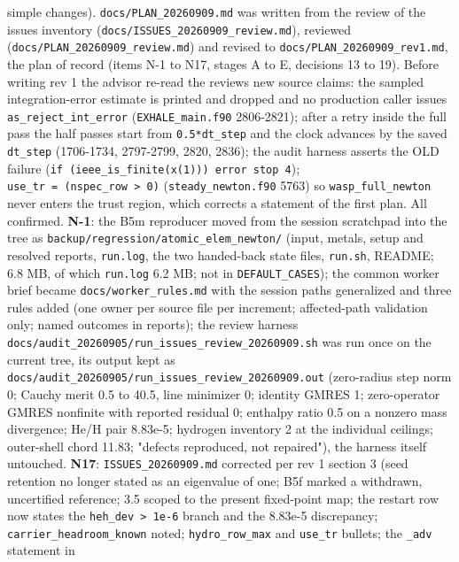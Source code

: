 \documentclass[english,a4paper]{my_memo}
\begin{document}
\begin{itemize}
{  simple changes).} \texttt{docs/PLAN\_20260909.md} was written from the review of
  the issues inventory (\texttt{docs/ISSUES\_20260909\_review.md}), reviewed
  (\texttt{docs/PLAN\_20260909\_review.md}) and revised to \texttt{docs/PLAN\_20260909\_rev1.md},
  the plan of record (items N-1 to N17, stages A to E, decisions 13 to 19).
  Before writing rev 1 the advisor re-read the review\textquotesingle s new source claims:
  the sampled integration-error estimate is printed and dropped and no
  production caller issues \texttt{as\_reject\_int\_error} (\texttt{EXHALE\_main.f90}
  2806-2821); after a retry inside the full pass the half passes start from
  \texttt{0.5*dt\_step} and the clock advances by the saved \texttt{dt\_step} (1706-1734,
  2797-2799, 2820, 2836); the audit harness asserts the OLD failure
  (\texttt{if\ (ieee\_is\_finite(x(1)))\ error\ stop\ 4}); \texttt{use\_tr\ =\ (nspec\_row\ \textgreater{}\ 0)}
  (\texttt{steady\_newton.f90} 5763) so \texttt{wasp\_full\_newton} never enters the trust
  region, which corrects a statement of the first plan. All confirmed. \textbf{N-1}:
  the B5m reproducer moved from the session scratchpad into the tree as
  \texttt{backup/regression/atomic\_elem\_newton/} (input, metals, setup and resolved
  reports, \texttt{run.log}, the two handed-back state files, \texttt{run.sh}, README;
  6.8 MB, of which \texttt{run.log} 6.2 MB; not in \texttt{DEFAULT\_CASES}); the common
  worker brief became \texttt{docs/worker\_rules.md} with the session paths
  generalized and three rules added (one owner per source file per
  increment; affected-path validation only; named outcomes in reports); the
  review harness \texttt{docs/audit\_20260905/run\_issues\_review\_20260909.sh} was run
  once on the current tree, its output kept as
  \texttt{docs/audit\_20260905/run\_issues\_review\_20260909.out} (zero-radius step
  norm 0; Cauchy merit 0.5 to 40.5, line minimizer 0; identity GMRES 1;
  zero-operator GMRES nonfinite with reported residual 0; enthalpy ratio
  0.5 on a nonzero mass divergence; He/H pair 8.83e-5; hydrogen inventory 2
  at the individual ceilings; outer-shell chord 11.83; "defects reproduced,
  not repaired"), the harness itself untouched. \textbf{N17}: \texttt{ISSUES\_20260909.md}
  corrected per rev 1 section 3 (seed retention no longer stated as an
  eigenvalue of one; B5f marked a withdrawn, uncertified reference; 3.5
  scoped to the present fixed-point map; the restart row now states the
  \texttt{heh\_dev\ \textgreater{}\ 1e-6} branch and the 8.83e-5 discrepancy; \texttt{carrier\_headroom\_known}
  noted; \texttt{hydro\_row\_max} and \texttt{use\_tr} bullets; the \texttt{\_adv} statement in

\end{itemize}
\end{document}
